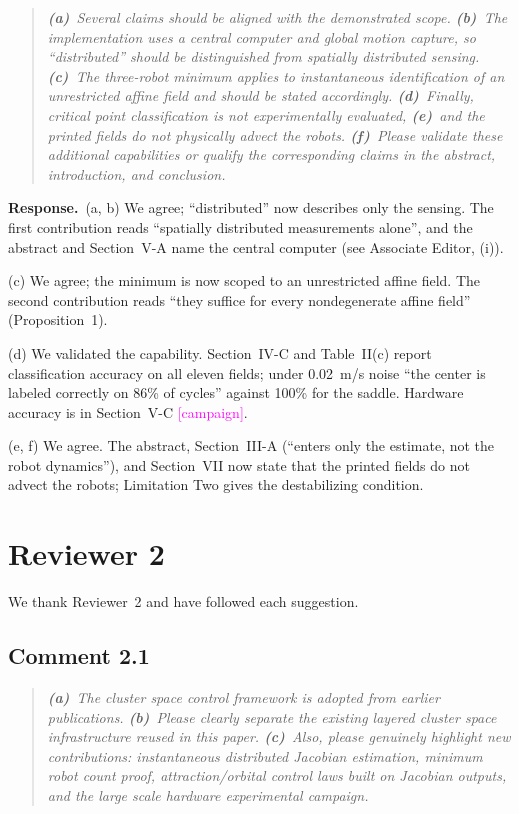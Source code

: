 \documentclass[10pt]{article}
\newcommand{\rev}[1]{#1}                             %
\newcommand{\open}[1]{\textcolor{magenta}{[#1]}}     %
\newcommand{\resp}{\par\textbf{Response.}~}
\begin{document}
\begin{quote}\itshape
\textbf{(a)}~Several claims should be aligned with the demonstrated scope.
\textbf{(b)}~The implementation uses a central computer and global motion capture, so ``distributed'' should be distinguished from spatially distributed sensing.
\textbf{(c)}~The three-robot minimum applies to instantaneous identification of an unrestricted affine field and should be stated accordingly.
\textbf{(d)}~Finally, critical point classification is not experimentally evaluated,
\textbf{(e)}~and the printed fields do not physically advect the robots.
\textbf{(f)}~Please validate these additional capabilities or qualify the corresponding claims in the abstract, introduction, and conclusion.
\end{quote}

\resp (a, b) We agree; ``distributed'' now describes only the sensing. The first contribution reads ``spatially distributed measurements alone'', and the abstract and Section~V-A name the central computer (see Associate Editor, (i)).

(c) We agree; the minimum is now scoped to an unrestricted affine field. The second contribution reads ``they suffice for every nondegenerate affine field'' (Proposition~1).

(d) We validated the capability. Section~IV-C and Table~II(c) report classification accuracy on all eleven fields; under 0.02~m/s noise ``the center is labeled correctly on \rev{86}\% of cycles'' against \rev{100}\% for the saddle. Hardware accuracy is in Section~V-C \open{campaign}.

(e, f) We agree. The abstract, Section~III-A (``enters only the estimate, not the robot dynamics''), and Section~VII now state that the printed fields do not advect the robots; Limitation Two gives the destabilizing condition.

\section*{Reviewer 2}

We thank Reviewer~2 and have followed each suggestion.

\subsection*{Comment 2.1}

\begin{quote}\itshape
\textbf{(a)}~The cluster space control framework is adopted from earlier publications.
\textbf{(b)}~Please clearly separate the existing layered cluster space infrastructure reused in this paper.
\textbf{(c)}~Also, please genuinely highlight new contributions: instantaneous distributed Jacobian estimation, minimum robot count proof, attraction/orbital control laws built on Jacobian outputs, and the large scale hardware experimental campaign.
\end{quote}
\end{document}
